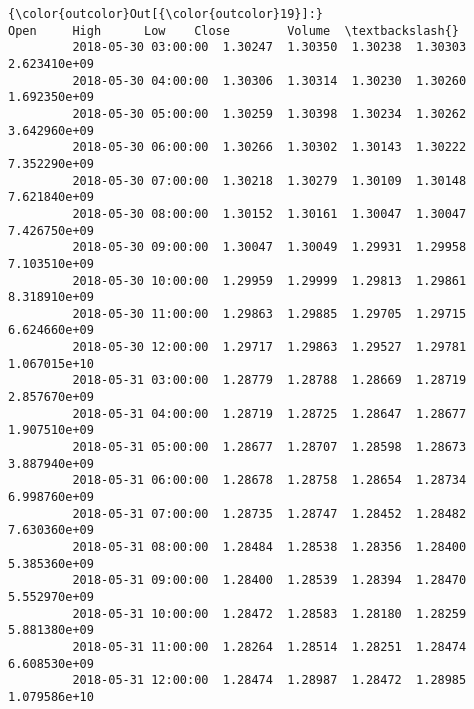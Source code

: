 \documentclass[11pt]{article}
\begin{document}
\begin{Verbatim}[commandchars=\\\{\}]
{\color{outcolor}Out[{\color{outcolor}19}]:}                         Open     High      Low    Close        Volume  \textbackslash{}
         2018-05-30 03:00:00  1.30247  1.30350  1.30238  1.30303  2.623410e+09   
         2018-05-30 04:00:00  1.30306  1.30314  1.30230  1.30260  1.692350e+09   
         2018-05-30 05:00:00  1.30259  1.30398  1.30234  1.30262  3.642960e+09   
         2018-05-30 06:00:00  1.30266  1.30302  1.30143  1.30222  7.352290e+09   
         2018-05-30 07:00:00  1.30218  1.30279  1.30109  1.30148  7.621840e+09   
         2018-05-30 08:00:00  1.30152  1.30161  1.30047  1.30047  7.426750e+09   
         2018-05-30 09:00:00  1.30047  1.30049  1.29931  1.29958  7.103510e+09   
         2018-05-30 10:00:00  1.29959  1.29999  1.29813  1.29861  8.318910e+09   
         2018-05-30 11:00:00  1.29863  1.29885  1.29705  1.29715  6.624660e+09   
         2018-05-30 12:00:00  1.29717  1.29863  1.29527  1.29781  1.067015e+10   
         2018-05-31 03:00:00  1.28779  1.28788  1.28669  1.28719  2.857670e+09   
         2018-05-31 04:00:00  1.28719  1.28725  1.28647  1.28677  1.907510e+09   
         2018-05-31 05:00:00  1.28677  1.28707  1.28598  1.28673  3.887940e+09   
         2018-05-31 06:00:00  1.28678  1.28758  1.28654  1.28734  6.998760e+09   
         2018-05-31 07:00:00  1.28735  1.28747  1.28452  1.28482  7.630360e+09   
         2018-05-31 08:00:00  1.28484  1.28538  1.28356  1.28400  5.385360e+09   
         2018-05-31 09:00:00  1.28400  1.28539  1.28394  1.28470  5.552970e+09   
         2018-05-31 10:00:00  1.28472  1.28583  1.28180  1.28259  5.881380e+09   
         2018-05-31 11:00:00  1.28264  1.28514  1.28251  1.28474  6.608530e+09   
         2018-05-31 12:00:00  1.28474  1.28987  1.28472  1.28985  1.079586e+10   
         

\end{Verbatim}
\end{document}
